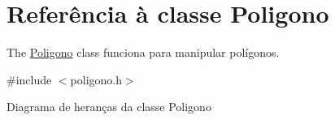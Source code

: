 \hypertarget{class_poligono}{}\section{Referência à classe Poligono}
\label{class_poligono}


The \hyperlink{class_poligono}{Poligono} class funciona para manipular polígonos.  




{\ttfamily \#include $<$poligono.\+h$>$}



Diagrama de heranças da classe Poligono
